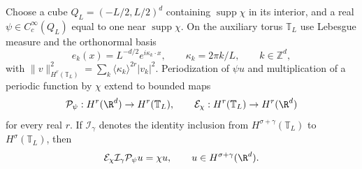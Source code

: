 \begin{lemma}\label{L:cutoff-factorization}
  Choose a cube $Q_L=(-L/2,L/2)^d$ containing $\operatorname{supp}\chi$
  in its interior, and a real $\psi \in C_c^\infty(Q_L)$ equal to one
  near $\operatorname{supp}\chi$. On the auxiliary torus $\mathbb T_L$ use
  Lebesgue measure and the orthonormal basis
  \[
    e_k(x)=L^{-d/2}e^{i\kappa_k\cdot x},\qquad
    \kappa_k=2\pi k/L,\qquad k \in \mathbb Z^d,
  \]
  with $\|v\|_{H^r(\mathbb T_L)}^2
  =\sum_k\langle\kappa_k\rangle^{2r}|v_k|^2$. Periodization of $\psi u$
  and multiplication of a periodic function by $\chi$ extend to bounded maps
  \begin{equation}\label{E:cutoff-periodic-maps}
    \mathcal P_\psi:H^r(\R^d)\to H^r(\mathbb T_L),\qquad
    \mathcal E_\chi:H^r(\mathbb T_L)\to H^r(\R^d)
  \end{equation}
  for every real $r$. If $\mathcal I_\gamma$ denotes the identity inclusion
  from $H^{\sigma+\gamma}(\mathbb T_L)$ to $H^\sigma(\mathbb T_L)$, then
  \begin{equation}\label{E:cutoff-whole-space-recovery}
    \mathcal E_\chi\mathcal I_\gamma\mathcal P_\psi u=\chi u,
    \qquad u \in H^{\sigma+\gamma}(\R^d).
  \end{equation}
\end{lemma}

